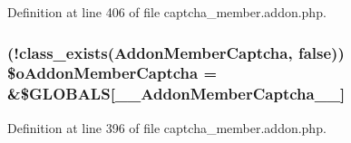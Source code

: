 Definition at line 406 of file captcha\+\_\+member.\+addon.\+php.

\hypertarget{captcha__member_8addon_8php_a31cda8178bc3156a0f1ea23c851844dd}{}
\subsubsection[{\$o\+Addon\+Member\+Captcha}]{ (!class\+\_\+exists(\textquotesingle{}Addon\+Member\+Captcha\textquotesingle{}, false)) \$o\+Addon\+Member\+Captcha = \&\$G\+L\+O\+B\+A\+L\+S\mbox{[}\textquotesingle{}\+\_\+\+\_\+\+Addon\+Member\+Captcha\+\_\+\+\_\+\textquotesingle{}\mbox{]}}\label{captcha__member_8addon_8php_a31cda8178bc3156a0f1ea23c851844dd}


Definition at line 396 of file captcha\+\_\+member.\+addon.\+php.

